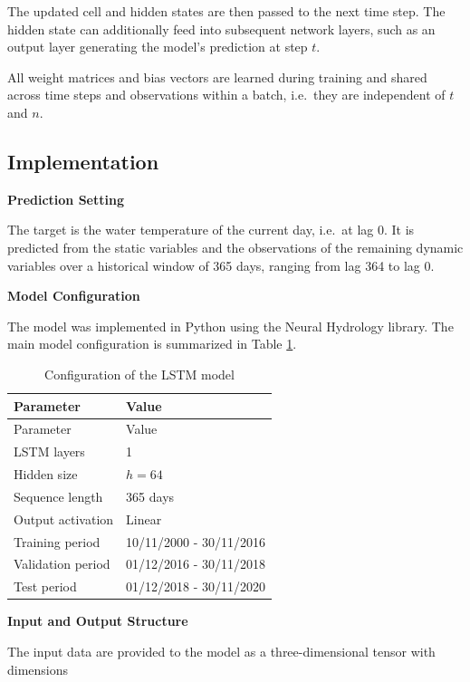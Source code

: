 \documentclass[
]{krantz}
\begin{document}
The updated cell and hidden states are then passed to the next time step. The hidden state can additionally feed into subsequent network layers, such as an output layer generating the model's prediction at step \(t\).

All weight matrices and bias vectors are learned during training and shared across time steps and observations within a batch, i.e.~they are independent of \(t\) and \(n\).

\newpage

\subsection{Implementation}\label{sec-model-impl}

\textbf{Prediction Setting}

The target is the water temperature of the current day, i.e.~at lag 0. It is predicted from the static variables and the observations of the remaining dynamic variables over a historical window of 365 days, ranging from lag 364 to lag 0.

\textbf{Model Configuration}

The model was implemented in Python using the Neural Hydrology library. The main model configuration is summarized in Table \ref{tab:lstm-config}.

\begin{longtable}[]{@{}ll@{}}
\caption{\label{tab:lstm-config} Configuration of the LSTM model}\tabularnewline
\toprule\noalign{}
Parameter & Value \\
\midrule\noalign{}
\endfirsthead
\toprule\noalign{}
Parameter & Value \\
\midrule\noalign{}
\endhead
\bottomrule\noalign{}
\endlastfoot
LSTM layers & 1 \\
Hidden size & \(h = 64\) \\
Sequence length & 365 days \\
Output activation & Linear \\
Training period & 10/11/2000 - 30/11/2016 \\
Validation period & 01/12/2016 - 30/11/2018 \\
Test period & 01/12/2018 - 30/11/2020 \\
\end{longtable}

\textbf{Input and Output Structure}

The input data are provided to the model as a three-dimensional tensor with dimensions
\end{document}
